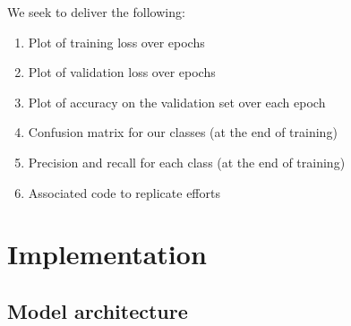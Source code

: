 \documentclass[letterpaper, 12pt]{article}
\begin{document}
We seek to deliver the following:
\begin{enumerate}
\item Plot of training loss over epochs
\item Plot of validation loss over epochs
\item Plot of accuracy on the validation set over each epoch
\item Confusion matrix for our classes (at the end of training)
\item Precision and recall for each class (at the end of training)
\item Associated code to replicate efforts
\end{enumerate}

\section{Implementation}
\subsection{Model architecture}
\end{document}
